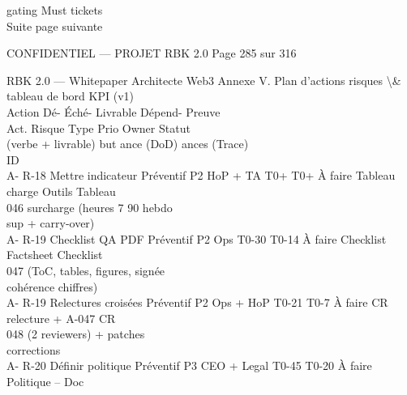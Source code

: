 \documentclass[12pt,landscape,a4paper]{article}
\newenvironment{confidential}
{\begin{tcolorbox}[
    colback=rbkred!5!white,
    colframe=rbkred!75!black,
    title=CONFIDENTIEL,
    fonttitle=\bfseries\color{white},
    coltitle=rbkred!75!black,
    breakable,
    enhanced,
    frame hidden,
    borderline west={2pt}{0pt}{rbkred!75!black}
]}
{\end{tcolorbox}}
\begin{document}
gating Must                                                            tickets\\
Suite page suivante\\
\vspace{0.5em}
\vspace{0.5em}
\vspace{0.5em}
\vspace{0.5em}
\begin{confidential}CONFIDENTIEL — PROJET RBK 2.0                                           Page 285 sur 316\end{confidential}
RBK 2.0 — Whitepaper Architecte Web3                                                                         Annexe V. Plan d’actions risques \textbackslash{}& tableau de bord KPI (v1)\\
\vspace{0.5em}
\vspace{0.5em}
Action                                            Dé- Éché-             Livrable       Dépend- Preuve\\
Act. Risque                        Type      Prio Owner                   Statut\\
(verbe + livrable)                                but ance              (DoD)          ances   (Trace)\\
ID\\
A- R-18     Mettre indicateur      Préventif P2   HoP + TA    T0+ T0+ À faire       Tableau charge Outils   Tableau\\
046         surcharge (heures                                 7     90              hebdo\\
sup + carry-over)\\
A- R-19     Checklist QA PDF Préventif P2         Ops         T0-30 T0-14 À faire   Checklist      Factsheet Checklist\\
047         (ToC, tables, figures,                                                  signée\\
cohérence chiffres)\\
A- R-19     Relectures croisées Préventif P2      Ops + HoP T0-21 T0-7 À faire      CR relecture + A-047    CR\\
048         (2 reviewers) +                                                         patches\\
corrections\\
A- R-20     Définir politique      Préventif P3   CEO + Legal T0-45 T0-20 À faire   Politique      –        Doc\\
\end{document}
